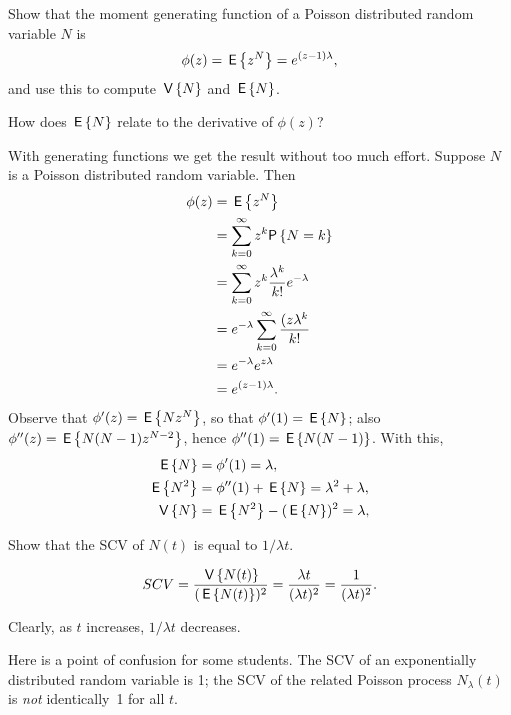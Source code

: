 \begin{question}
Show that the moment generating function of a Poisson distributed random variable $N$ is
\begin{equation*}
\phi(z)=  \,\mathsf{E}\left\{z^N\right\}  = e^{(z-1)\lambda},
\end{equation*}
and use this to compute $\,\mathsf{V}\left\{N\right\}$ and $\,\mathsf{E}\left\{N\right\}$. 
\begin{hint}
  How does   $\,\mathsf{E}\left\{N\right\}$ relate to the derivative of $\phi(z)$? 
\end{hint}
\begin{solution}
With generating functions we get the result without too much
effort. Suppose $N$ is a Poisson distributed random variable. Then 
\begin{equation*}
  \begin{split}
\phi(z)
&=  \E{z^N} \\
&= \sum_{k=0}^\infty z^k \P{N=k} \\
&= \sum_{k=0}^\infty z^k \frac{\lambda^k}{k!} e^{-\lambda}  \\
&= e^{-\lambda} \sum_{k=0}^\infty  \frac{(z\lambda^k}{k!}  \\
&= e^{-\lambda} e^{z \lambda} \\
&= e^{(z-1)\lambda}.
  \end{split}
\end{equation*}
Observe that $\phi'(z) = \,\mathsf{E}\left\{N z^N\right\}$, so that $\phi'(1)=\,\mathsf{E}\left\{N\right\}$; also
$\phi''(z)=\,\mathsf{E}\left\{N(N-1)z^{N-2}\right\}$, hence $\phi''(1)=\,\mathsf{E}\left\{N(N-1)\right\}$. With this,
  \begin{align*}
    \,\mathsf{E}\left\{N\right\} &= \phi'(1)= \lambda,\\
\,\mathsf{E}\left\{N^2\right\} &= \phi''(1) + \,\mathsf{E}\left\{N\right\} = \lambda^2 + \lambda,\\
\,\mathsf{V}\left\{N\right\} &= \,\mathsf{E}\left\{N^2\right\}-(\,\mathsf{E}\left\{N\right\})^2 = \lambda,\\
  \end{align*}
\end{solution}
\end{question}

\begin{question}
Show that   the SCV of $N(t)$ is equal to $1/\lambda t$. 

  \begin{solution}
    \begin{equation*}
SCV = \frac{\,\mathsf{V}\left\{N(t)\right\}}{(\,\mathsf{E}\left\{N(t)\right\})^2} = \frac{\lambda t}{(\lambda t)^2} = \frac1{(\lambda t)^2}.
    \end{equation*}

Clearly, as $t$
increases, $1/\lambda t$ decreases.

Here is a point of confusion for some students. The SCV of an
exponentially distributed random variable is 1; the SCV of the related
Poisson process $N_\lambda(t)$ is \emph{not} identically~1 for all
$t$.
  \end{solution}

\end{question}


